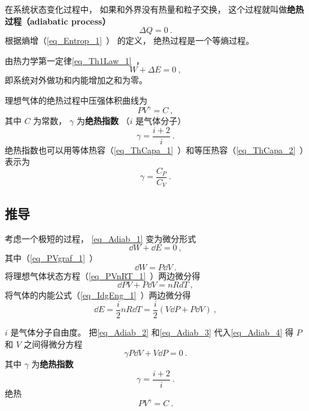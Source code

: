 

在系统状态变化过程中， 如果和外界没有热量和粒子交换， 这个过程就叫做\textbf{绝热过程（adiabatic process）}
\begin{equation}
\Delta Q = 0~.
\end{equation}
根据熵增（\autoref{eq_Entrop_1}~） 的定义， 绝热过程是一个等熵过程。

由热力学第一定律\autoref{eq_Th1Law_1}~，
\begin{equation}\label{eq_Adiab_1}
W + \Delta E = 0~,
\end{equation}
即系统对外做功和内能增加之和为零。

理想气体的绝热过程中压强体积曲线为
\begin{equation}\label{eq_Adiab_5}
P V^\gamma = C~,
\end{equation}
其中 $C$ 为常数， $\gamma$ 为\textbf{绝热指数} （$i$ 是气体分子）
\begin{equation}
\gamma = \frac{i+2}{i}~.
\end{equation}
绝热指数也可以用等体热容（\autoref{eq_ThCapa_1}~）和等压热容（\autoref{eq_ThCapa_2}~）表示为
\begin{equation}
\gamma = \frac{C_P}{C_V}~.
\end{equation}


\subsection{推导}
考虑一个极短的过程， \autoref{eq_Adiab_1} 变为微分形式
\begin{equation}\label{eq_Adiab_4}
\dd{W} + \dd{E} = 0~,
\end{equation}
其中（\autoref{eq_PVgraf_1}~）
\begin{equation}\label{eq_Adiab_2}
\dd{W} = P\dd{V}~.
\end{equation}
将理想气体状态方程（\autoref{eq_PVnRT_1}~）两边微分得
\begin{equation}
\dd{P}V + P\dd{V} = nRdT~,
\end{equation}
将气体的内能公式（\autoref{eq_IdgEng_1}~）两边微分得
\begin{equation}\label{eq_Adiab_3}
\dd{E} = \frac{i}{2}n R\dd{T} = \frac{i}{2} (V\dd{P} + P\dd{V})~,
\end{equation}


$i$ 是气体分子自由度。 把\autoref{eq_Adiab_2} 和\autoref{eq_Adiab_3} 代入\autoref{eq_Adiab_4} 得 $P$ 和 $V$ 之间得微分方程
\begin{equation}
\gamma P\dd{V} + V \dd{P} = 0~.
\end{equation}
其中 $\gamma$ 为\textbf{绝热指数}
\begin{equation}
\gamma = \frac{i+2}{i}~.
\end{equation}
绝热
\begin{equation}
P V^\gamma = C~.
\end{equation}



